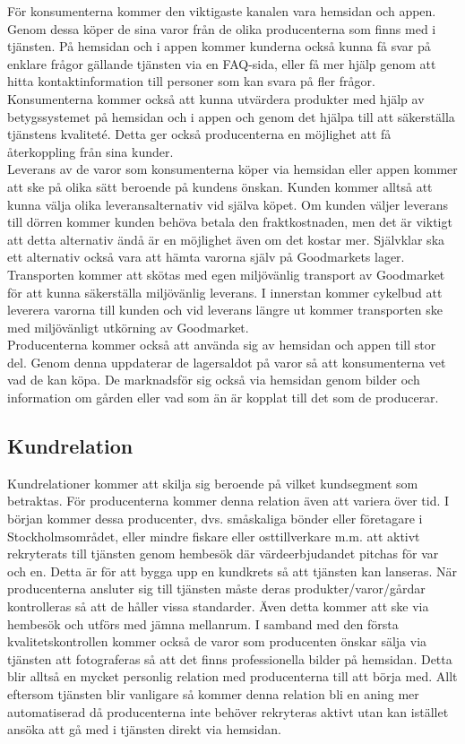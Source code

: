 \documentclass[10pt,a4paper,oneside]{article}
\begin{document}
För konsumenterna kommer den viktigaste kanalen vara hemsidan och appen. Genom dessa köper de sina varor från de olika producenterna som finns med i tjänsten. På hemsidan och i appen kommer kunderna också kunna få svar på enklare frågor gällande tjänsten via en FAQ-sida, eller få mer hjälp genom att hitta kontaktinformation till personer som kan svara på fler frågor. Konsumenterna kommer också att kunna utvärdera produkter med hjälp av betygssystemet på hemsidan och i appen och genom det hjälpa till att säkerställa tjänstens kvaliteté. Detta ger också producenterna en möjlighet att få återkoppling från sina kunder. \\ 

Leverans av de varor som konsumenterna köper via  hemsidan eller appen kommer att ske på olika sätt beroende på kundens önskan. Kunden kommer alltså att kunna välja olika leveransalternativ vid själva köpet. Om kunden väljer leverans till dörren kommer kunden behöva betala den fraktkostnaden, men det är viktigt att detta alternativ ändå är en möjlighet även om det kostar mer. Självklar ska ett alternativ också vara att hämta varorna själv på Goodmarkets lager. Transporten kommer att skötas med egen miljövänlig transport av Goodmarket för att kunna säkerställa miljövänlig leverans. I innerstan kommer cykelbud att leverera varorna till kunden och vid leverans längre ut kommer transporten ske med miljövänligt utkörning av Goodmarket.\\

Producenterna kommer också att använda sig av hemsidan och appen till stor del. Genom denna uppdaterar de lagersaldot på varor så att konsumenterna vet vad de kan köpa. De marknadsför sig också via hemsidan genom bilder och information om gården eller vad som än är kopplat till det som de producerar. 


\subsection{Kundrelation}
Kundrelationer kommer att skilja sig beroende på vilket kundsegment som betraktas. För producenterna kommer denna relation även att variera över tid. I början kommer dessa producenter, dvs. småskaliga bönder eller företagare i Stockholmsområdet, eller mindre fiskare eller osttillverkare m.m. att aktivt rekryterats till tjänsten genom hembesök där värdeerbjudandet pitchas för var och en. Detta är för att bygga upp en kundkrets så att tjänsten kan lanseras. När producenterna ansluter sig till tjänsten måste deras produkter/varor/gårdar kontrolleras så att de håller vissa standarder. Även detta kommer att ske via hembesök och utförs med jämna mellanrum. I samband med den första kvalitetskontrollen kommer också de varor som producenten önskar sälja via tjänsten att fotograferas så att det finns professionella bilder på hemsidan. Detta blir alltså en mycket personlig relation med producenterna till att börja med. Allt eftersom tjänsten blir vanligare så kommer denna relation bli en aning mer automatiserad då producenterna inte behöver rekryteras aktivt utan kan istället ansöka att gå med i tjänsten direkt via hemsidan. \\
\end{document}
